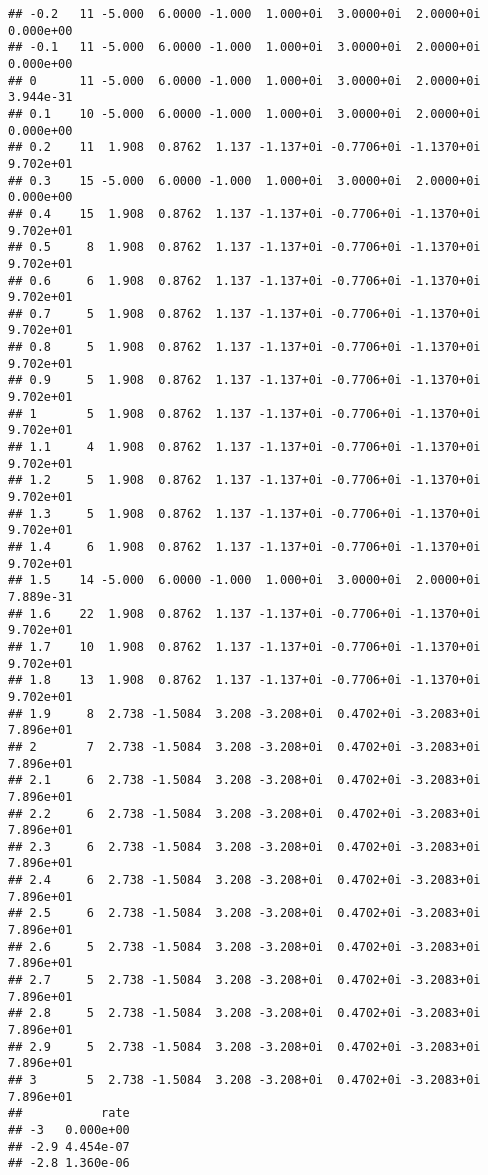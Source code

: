 \documentclass[
  12pt,
]{article}
\begin{document}
\begin{verbatim}
## -0.2   11 -5.000  6.0000 -1.000  1.000+0i  3.0000+0i  2.0000+0i 0.000e+00
## -0.1   11 -5.000  6.0000 -1.000  1.000+0i  3.0000+0i  2.0000+0i 0.000e+00
## 0      11 -5.000  6.0000 -1.000  1.000+0i  3.0000+0i  2.0000+0i 3.944e-31
## 0.1    10 -5.000  6.0000 -1.000  1.000+0i  3.0000+0i  2.0000+0i 0.000e+00
## 0.2    11  1.908  0.8762  1.137 -1.137+0i -0.7706+0i -1.1370+0i 9.702e+01
## 0.3    15 -5.000  6.0000 -1.000  1.000+0i  3.0000+0i  2.0000+0i 0.000e+00
## 0.4    15  1.908  0.8762  1.137 -1.137+0i -0.7706+0i -1.1370+0i 9.702e+01
## 0.5     8  1.908  0.8762  1.137 -1.137+0i -0.7706+0i -1.1370+0i 9.702e+01
## 0.6     6  1.908  0.8762  1.137 -1.137+0i -0.7706+0i -1.1370+0i 9.702e+01
## 0.7     5  1.908  0.8762  1.137 -1.137+0i -0.7706+0i -1.1370+0i 9.702e+01
## 0.8     5  1.908  0.8762  1.137 -1.137+0i -0.7706+0i -1.1370+0i 9.702e+01
## 0.9     5  1.908  0.8762  1.137 -1.137+0i -0.7706+0i -1.1370+0i 9.702e+01
## 1       5  1.908  0.8762  1.137 -1.137+0i -0.7706+0i -1.1370+0i 9.702e+01
## 1.1     4  1.908  0.8762  1.137 -1.137+0i -0.7706+0i -1.1370+0i 9.702e+01
## 1.2     5  1.908  0.8762  1.137 -1.137+0i -0.7706+0i -1.1370+0i 9.702e+01
## 1.3     5  1.908  0.8762  1.137 -1.137+0i -0.7706+0i -1.1370+0i 9.702e+01
## 1.4     6  1.908  0.8762  1.137 -1.137+0i -0.7706+0i -1.1370+0i 9.702e+01
## 1.5    14 -5.000  6.0000 -1.000  1.000+0i  3.0000+0i  2.0000+0i 7.889e-31
## 1.6    22  1.908  0.8762  1.137 -1.137+0i -0.7706+0i -1.1370+0i 9.702e+01
## 1.7    10  1.908  0.8762  1.137 -1.137+0i -0.7706+0i -1.1370+0i 9.702e+01
## 1.8    13  1.908  0.8762  1.137 -1.137+0i -0.7706+0i -1.1370+0i 9.702e+01
## 1.9     8  2.738 -1.5084  3.208 -3.208+0i  0.4702+0i -3.2083+0i 7.896e+01
## 2       7  2.738 -1.5084  3.208 -3.208+0i  0.4702+0i -3.2083+0i 7.896e+01
## 2.1     6  2.738 -1.5084  3.208 -3.208+0i  0.4702+0i -3.2083+0i 7.896e+01
## 2.2     6  2.738 -1.5084  3.208 -3.208+0i  0.4702+0i -3.2083+0i 7.896e+01
## 2.3     6  2.738 -1.5084  3.208 -3.208+0i  0.4702+0i -3.2083+0i 7.896e+01
## 2.4     6  2.738 -1.5084  3.208 -3.208+0i  0.4702+0i -3.2083+0i 7.896e+01
## 2.5     6  2.738 -1.5084  3.208 -3.208+0i  0.4702+0i -3.2083+0i 7.896e+01
## 2.6     5  2.738 -1.5084  3.208 -3.208+0i  0.4702+0i -3.2083+0i 7.896e+01
## 2.7     5  2.738 -1.5084  3.208 -3.208+0i  0.4702+0i -3.2083+0i 7.896e+01
## 2.8     5  2.738 -1.5084  3.208 -3.208+0i  0.4702+0i -3.2083+0i 7.896e+01
## 2.9     5  2.738 -1.5084  3.208 -3.208+0i  0.4702+0i -3.2083+0i 7.896e+01
## 3       5  2.738 -1.5084  3.208 -3.208+0i  0.4702+0i -3.2083+0i 7.896e+01
##           rate
## -3   0.000e+00
## -2.9 4.454e-07
## -2.8 1.360e-06

\end{verbatim}
\end{document}
